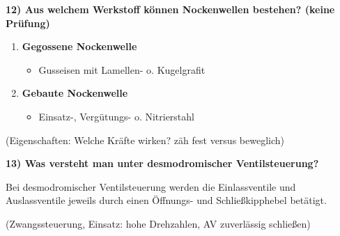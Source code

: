\textbf{12) Aus welchem Werkstoff können Nockenwellen bestehen? (keine
Prüfung)}

\begin{enumerate}
\item
  \textbf{Gegossene Nockenwelle}

  \begin{itemize}
  \item
    Gusseisen mit Lamellen- o. Kugelgrafit
  \end{itemize}
\item
  \textbf{Gebaute Nockenwelle}

  \begin{itemize}
  \item
    Einsatz-, Vergütungs- o. Nitrierstahl
  \end{itemize}
\end{enumerate}

(Eigenschaften: Welche Kräfte wirken? zäh fest versus beweglich)

\textbf{13) Was versteht man unter desmodromischer Ventilsteuerung?}

Bei desmodromischer Ventilsteuerung werden die Einlassventile und
Auslassventile jeweils durch einen Öffnungs- und Schließkipphebel
betätigt.

(Zwangssteuerung, Einsatz: hohe Drehzahlen, AV zuverlässig schließen)
